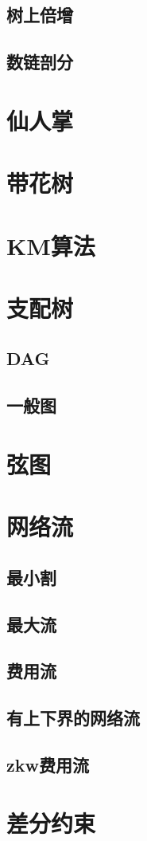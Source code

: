 \subsection{树上倍增}
\subsection{数链剖分}
\section{仙人掌}
\section{带花树}
\section{KM算法}
\section{支配树}
\subsection{DAG}
\subsection{一般图}
\section{弦图}
\section{网络流}
\subsection{最小割}
\subsection{最大流}
\subsection{费用流}
\subsection{有上下界的网络流}
\subsection{zkw费用流}
\section{差分约束}